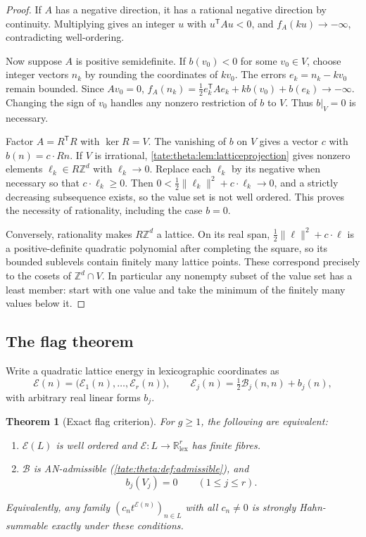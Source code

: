 \documentclass[11pt,letterpaper]{article}
\newtheorem{theorem}{Theorem}[section]
\theoremstyle{definition}
\newcommand{\R}{\mathbb R}
\newcommand{\Z}{\mathbb Z}
\newcommand{\lex}{\mathrm{lex}}
\newcommand{\cB}{\mathcal B}
\newcommand{\cE}{\mathcal E}
\begin{document}
\begin{proof}
If $A$ has a negative direction, it has a rational negative direction by
continuity. Multiplying gives an integer $u$ with $u^{\mathsf T}Au<0$, and
$f_A(ku)\to-\infty$, contradicting well-ordering.

Now suppose $A$ is positive semidefinite. If $b(v_0)<0$ for some
$v_0\in V$, choose integer vectors $n_k$ by rounding the coordinates of
$kv_0$. The errors $e_k=n_k-kv_0$ remain bounded. Since $Av_0=0$,
$f_A(n_k)=\tfrac12e_k^{\mathsf T}Ae_k+kb(v_0)+b(e_k)\to-\infty$. Changing
the sign of $v_0$ handles any nonzero restriction of $b$ to $V$. Thus
$b|_V=0$ is necessary.

Factor $A=R^{\mathsf T}R$ with $\ker R=V$. The vanishing of $b$ on $V$ gives
a vector $c$ with $b(n)=c\cdot Rn$. If $V$ is irrational,
\cref{tate:theta:lem:latticeprojection} gives nonzero elements
$\ell_k\in R\Z^d$ with $\ell_k\to0$. Replace each $\ell_k$ by its negative
when necessary so that $c\cdot\ell_k\ge0$. Then
$0<\tfrac12\|\ell_k\|^2+c\cdot\ell_k\to0$, and a strictly decreasing
subsequence exists, so the value set is not well ordered. This proves the
necessity of rationality, including the case $b=0$.

Conversely, rationality makes $R\Z^d$ a lattice. On its real span,
$\tfrac12\|\ell\|^2+c\cdot\ell$ is a positive-definite quadratic polynomial
after completing the square, so its bounded sublevels contain finitely many
lattice points. These correspond precisely to the cosets of $\Z^d\cap V$.
In particular any nonempty subset of the value set has a least member:
start with one value and take the minimum of the finitely many values below
it.
\end{proof}

\subsection{The flag theorem}

Write a quadratic lattice energy in lexicographic coordinates as
\begin{equation}
 \cE(n)=\bigl(\cE_1(n),\ldots,\cE_r(n)\bigr),\qquad
 \cE_j(n)=\tfrac12\cB_j(n,n)+b_j(n),\label{tate:theta:eq:lexenergy}
\end{equation}
with arbitrary real linear forms $b_j$.

\begin{theorem}[Exact flag criterion]\label{tate:theta:thm:flag}
For $g\ge1$, the following are equivalent:
\begin{enumerate}[label=(\roman*)]
\item $\cE(L)$ is well ordered and $\cE:L\to\R^r_{\lex}$ has finite fibres.
\item $\cB$ is AN-admissible (\cref{tate:theta:def:admissible}), and
\begin{equation}
 b_j(V_j)=0\qquad(1\le j\le r).\label{tate:theta:eq:linearcompatibility}
\end{equation}
\end{enumerate}
Equivalently, any family $(c_nt^{\cE(n)})_{n\in L}$ with all $c_n\ne0$ is
strongly Hahn-summable exactly under these conditions.
\end{theorem}
\end{document}
